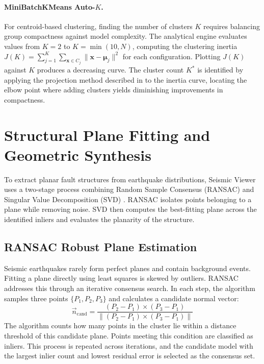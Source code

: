 \paragraph{MiniBatchKMeans Auto-$K$.}
For centroid-based clustering, finding the number of clusters $K$ requires balancing group compactness against model complexity. The analytical engine evaluates values from $K=2$ to $K=\min(10, N)$, computing the clustering inertia $J(K) = \sum_{j=1}^K \sum_{\mathbf{x} \in C_j} \|\mathbf{x} - \bm{\mu}_j\|^2$ for each configuration. Plotting $J(K)$ against $K$ produces a decreasing curve. The cluster count $K^*$ is identified by applying the projection method described in  to the inertia curve, locating the elbow point where adding clusters yields diminishing improvements in compactness.

\section{Structural Plane Fitting and Geometric Synthesis}
\label{sec:ransac-svd}
\label{sec:convex-hull}

To extract planar fault structures from earthquake distributions, Seismic Viewer uses a two-stage process combining Random Sample Consensus (RANSAC) \cite{fischler1981ransac} and Singular Value Decomposition (SVD) \cite{shakarji1998least}. RANSAC isolates points belonging to a plane while removing noise. SVD then computes the best-fitting plane across the identified inliers and evaluates the planarity of the structure.

\subsection{RANSAC Robust Plane Estimation}

Seismic earthquakes rarely form perfect planes and contain background events. Fitting a plane directly using least squares is skewed by outliers. RANSAC addresses this through an iterative consensus search. In each step, the algorithm samples three points $\{P_1, P_2, P_3\}$ and calculates a candidate normal vector:
\begin{equation}
    \vec{n}_\text{cand} = \frac{(P_2 - P_1) \times (P_3 - P_1)}{\|(P_2 - P_1) \times (P_3 - P_1)\|}
    \label{eq:ransac-normal}
\end{equation}
The algorithm counts how many points in the cluster lie within a distance threshold of this candidate plane. Points meeting this condition are classified as inliers. This process is repeated across iterations, and the candidate model with the largest inlier count and lowest residual error is selected as the consensus set.

